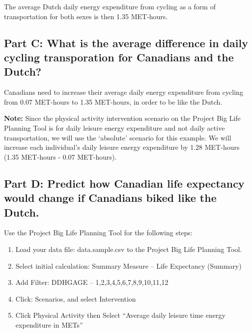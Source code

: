 \documentclass[]{book}
\begin{document}
The average Dutch daily energy expenditure from cycling as a form of transportation for both sexes is then 1.35 MET-hours.

\hypertarget{part-c-what-is-the-average-difference-in-daily-cycling-transporation-for-canadians-and-the-dutch}{%
\subsection{Part C: What is the average difference in daily cycling transporation for Canadians and the Dutch?}\label{part-c-what-is-the-average-difference-in-daily-cycling-transporation-for-canadians-and-the-dutch}}

Canadians need to increase their average daily energy expenditure from cycling from 0.07 MET-hours to 1.35 MET-hours, in order to be like the Dutch.

\textbf{Note:} Since the physical activity intervention scenario on the Project Big Life Planning Tool is for daily leisure energy expenditure and not daily active transportation, we will use the `absolute' scenario for this example. We will increase each individual's daily leisure energy expenditure by 1.28 MET-hours (1.35 MET-hours - 0.07 MET-hours).

\hypertarget{part-d-predict-how-canadian-life-expectancy-would-change-if-canadians-biked-like-the-dutch.}{%
\subsection{Part D: Predict how Canadian life expectancy would change if Canadians biked like the Dutch.}\label{part-d-predict-how-canadian-life-expectancy-would-change-if-canadians-biked-like-the-dutch.}}

Use the Project Big Life Planning Tool for the following steps:

\begin{enumerate}
\def\labelenumi{\arabic{enumi}.}
\item
  Load your data file: data.sample.csv to the Project Big Life Planning Tool.
\item
  Select initial calculation: Summary Measure -- Life Expectancy (Summary)
\item
  Add Filter: DDHGAGE -- 1,2,3,4,5,6,7,8,9,10,11,12
\item
  Click: Scenarios, and select Intervention
\item
  Click Physical Activity then Select ``Average daily leisure time energy expenditure in METs''
\end{enumerate}
\end{document}
